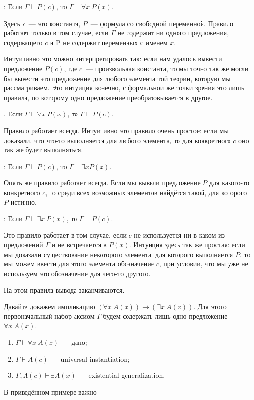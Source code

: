 : Если $\Gamma \vdash P(c)$, то $\Gamma\vdash \forall x\ P(x)$.

Здесь $c$~--- это константа, $P$~--- формула со свободной переменной. Правило работает только в том случае, если $\Gamma$ не содержит ни одного предложения, содержащего $c$ и P не содержит переменных с именем $x$.

Интуитивно это можно интерпретировать так: если нам удалось вывести предложение $P(c)$, где $c$~--- произвольная константа, то мы точно так же могли бы вывести это предложение для любого элемента той теории, которую мы рассматриваем. Это интуиция конечно, с формальной же точки зрения это лишь правила, по которому одно предложение преобразовывается в другое.

: Если $\Gamma \vdash \forall x\ P(x)$, то $\Gamma \vdash P(c)$.

Правило работает всегда. Интуитивно это правило очень простое: если мы доказали, что что-то выполняется для любого элемента, то для конкретного $c$ оно так же будет выполняться.

: Если $\Gamma \vdash P(c)$, то $\Gamma\vdash \exists x P(x)$.

Опять же правило работает всегда. Если мы вывели предложение $P$ для какого-то конкретного $c$, то среди всех возможных элементов найдётся такой, для которого $P$ истинно.

: Если $\Gamma \vdash \exists x\ P(x)$, то $\Gamma \vdash P(c)$.

Это правило работает в том случае, если $c$ не используется ни в каком из предложений $\Gamma$ и не встречается в $P(x)$. Интуиция здесь так же простая: если мы доказали существование некоторого элемента, для которого выполняется $P$, то мы можем ввести для этого элемента обозначение $c$, при условии, что мы уже не используем это обозначение для чего-то другого.

На этом правила вывода заканчиваются.

\begin{example}
Давайте докажем импликацию $(\forall x\ A(x)) \to (\exists x\ A(x))$. Для этого первоначальный набор аксиом $\Gamma$ будем содержать лишь одно предложение $\forall x\ A(x)$.
\begin{enumerate}
\item $\Gamma\vdash \forall x\ A(x)$~--- дано;
\item $\Gamma \vdash A(c)$~--- universal instantiation;
\item $\Gamma, A(c) \vdash \exists A(x)$~--- existential generalization.
\end{enumerate}
\end{example}

В приведённом примере важно